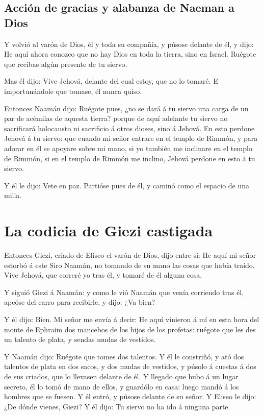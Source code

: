 \hypertarget{acciuxf3n-de-gracias-y-alabanza-de-naeman-a-dios}{%
\subsection{Acción de gracias y alabanza de Naeman a
Dios}\label{acciuxf3n-de-gracias-y-alabanza-de-naeman-a-dios}}

 Y volvió al varón de Dios, él y toda su compañía, y púsose
delante de él, y dijo: He aquí ahora conozco que no hay Dios en toda la
tierra, sino en Israel. Ruégote que recibas algún presente de tu siervo.

 Mas él dijo: Vive Jehová, delante del cual estoy, que no
lo tomaré. E importunándole que tomase, él nunca quiso.

 Entonces Naamán dijo: Ruégote pues, ¿no se dará á tu
siervo una carga de un par de acémilas de aquesta tierra? porque de aquí
adelante tu siervo no sacrificará holocausto ni sacrificio á otros
dioses, sino á Jehová.  En esto perdone Jehová á tu siervo:
que cuando mi señor entrare en el templo de Rimmón, y para adorar en él
se apoyare sobre mi mano, si yo también me inclinare en el templo de
Rimmón, si en el templo de Rimmón me inclino, Jehová perdone en esto á
tu siervo.

 Y él le dijo: Vete en paz. Partióse pues de él, y caminó
como el espacio de una milla.

\hypertarget{la-codicia-de-giezi-castigada}{%
\section{La codicia de Giezi
castigada}\label{la-codicia-de-giezi-castigada}}

 Entonces Giezi, criado de Eliseo el varón de Dios, dijo
entre sí: He aquí mi señor estorbó á este Siro Naamán, no tomando de su
mano las cosas que había traído. Vive Jehová, que correré yo tras él, y
tomaré de él alguna cosa.

 Y siguió Giezi á Naamán: y como le vió Naamán que venía
corriendo tras él, apeóse del carro para recibirle, y dijo: ¿Va bien?

 Y él dijo: Bien. Mi señor me envía á decir: He aquí
vinieron á mí en esta hora del monte de Ephraim dos mancebos de los
hijos de los profetas: ruégote que les des un talento de plata, y sendas
mudas de vestidos.

 Y Naamán dijo: Ruégote que tomes dos talentos. Y él le
constriñó, y ató dos talentos de plata en dos sacos, y dos mudas de
vestidos, y púsolo á cuestas á dos de sus criados, que lo llevasen
delante de él.  Y llegado que hubo á un lugar secreto, él
lo tomó de mano de ellos, y guardólo en casa: luego mandó á los hombres
que se fuesen.  Y él entró, y púsose delante de su señor. Y
Eliseo le dijo: ¿De dónde vienes, Giezi? Y él dijo: Tu siervo no ha ido
á ninguna parte.

